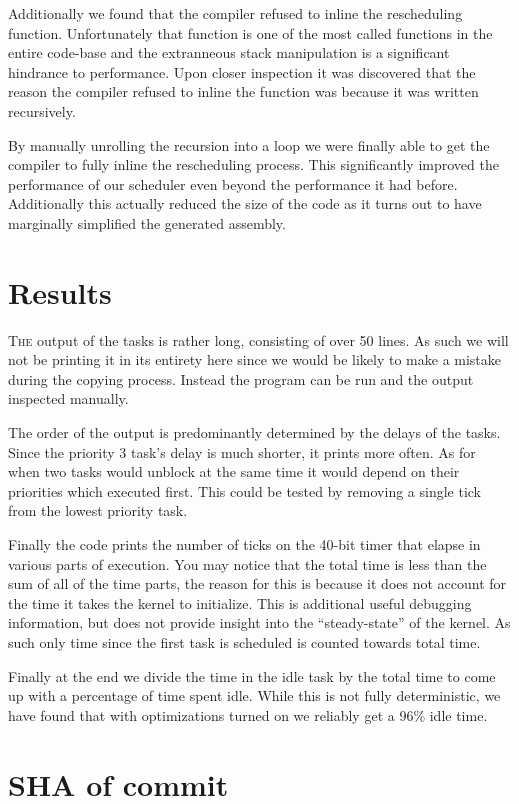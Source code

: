\documentclass{article}
\begin{document}
Additionally we found that the compiler refused to inline the rescheduling
function. Unfortunately that function is one of the most called functions in the
entire code-base and the extranneous stack manipulation is a significant
hindrance to performance. Upon closer inspection it was discovered that the
reason the compiler refused to inline the function was because it was written
recursively.

By manually unrolling the recursion into a loop we were finally able to get the
compiler to fully inline the rescheduling process. This significantly improved
the performance of our scheduler even beyond the performance it had before.
Additionally this actually reduced the size of the code as it turns out to have
marginally simplified the generated assembly.

\section*{Results}

\textsc{The} output of the tasks is rather long, consisting of over 50 lines. As
such we will not be printing it in its entirety here since we would be likely to
make a mistake during the copying process. Instead the program can be run and
the output inspected manually.

The order of the output is predominantly determined by the delays of the tasks.
Since the priority 3 task's delay is much shorter, it prints more often. As for
when two tasks would unblock at the same time it would depend on their
priorities which executed first. This could be tested by removing a single tick
from the lowest priority task.

Finally the code prints the number of ticks on the 40-bit timer that elapse in
various parts of execution. You may notice that the total time is less than the
sum of all of the time parts, the reason for this is because it does not account
for the time it takes the kernel to initialize. This is additional useful
debugging information, but does not provide insight into the ``steady-state'' of
the kernel. As such only time since the first task is scheduled is counted
towards total time.

Finally at the end we divide the time in the idle task by the total time to come
up with a percentage of time spent idle. While this is not fully deterministic,
we have found that with optimizations turned on we reliably get a 96\% idle
time.

\section*{SHA of commit}
\end{document}
